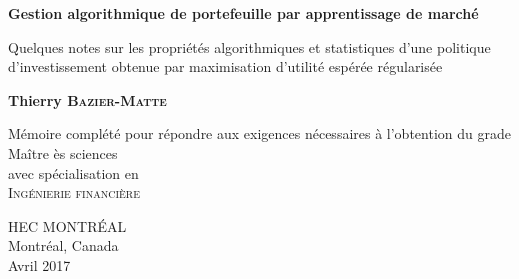 \begin{titlepage}
  \begin{center}
    \vspace*{1cm}
    
    \textbf{Gestion algorithmique de portefeuille par apprentissage de marché}
    
    \vspace{0.5cm}
    
    Quelques notes sur les propriétés algorithmiques et statistiques d'une politique
    d'investissement obtenue par maximisation d'utilité espérée régularisée
    
    
    \vspace{1.5cm}
    \textbf{Thierry \textsc{Bazier-Matte}}
        
    \vfill
        
    Mémoire complété pour répondre aux exigences nécessaires à l'obtention du grade\\
    Maître ès sciences\\
    avec spécialisation en\\
    \textsc{Ingénierie financière}        
    \vspace{5cm}
        
        
    HEC MONTRÉAL\\
    Montréal, Canada\\
    Avril 2017
  \end{center}
\end{titlepage}

